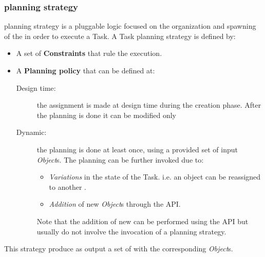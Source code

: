 \subsubsection{\utask{} planning strategy}
\utask{} planning strategy is a pluggable logic focused on the organization and
spawning of the \utask{} in order to execute a Task. A Task planning strategy is
defined by:
\begin{itemize}
    \item A set of \textbf{Constraints} that rule the execution.

    \item A \textbf{Planning policy} that can be defined at:
        \begin{description}
            \item[Design time:] the assignment is made at design time during the
            creation phase. After the planning is done it can be modified only

            \item[Dynamic:] the planning is done at least once, using a provided
            set of input \emph{Object}s. The planning can be further invoked due
            to:
            \begin{itemize}
                \item \emph{Variations} in the state of the Task. i.e. an object
                can be reassigned to another \utask{}.

                \item \emph{Addition} of new \emph{Object}s through the API.
            \end{itemize}
            Note that the addition of new \utask{} can be performed using the
            API but usually do not involve the invocation of a \utask{} planning
            strategy.
        \end{description}
\end{itemize}
This strategy produce as output a set of \utask{} with the corresponding
\emph{Object}s.



